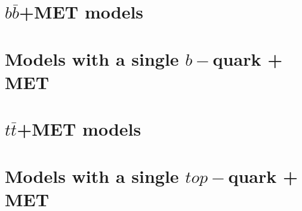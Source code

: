 \section{$b \bar{b}$+MET models}



\section{Models with a single $b-$quark + MET}



\section{$t \bar{t}$+MET models}



\section{Models with a single $top-$quark + MET}


